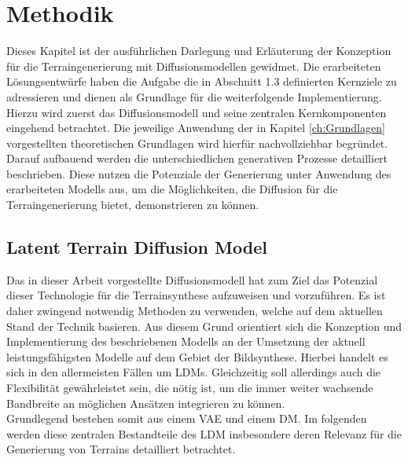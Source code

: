 \chapter{Methodik}
\label{ch:Methodik}

Dieses Kapitel ist der ausführlichen Darlegung und Erläuterung der Konzeption für die Terraingenerierung mit Diffusionsmodellen gewidmet. Die erarbeiteten Lösungsentwürfe haben die Aufgabe die in Abschnitt 1.3 definierten Kernziele zu adressieren und dienen als Grundlage für die weiterfolgende Implementierung. \\
Hierzu wird zuerst das Diffusionsmodell und seine zentralen Kernkomponenten eingehend betrachtet. Die jeweilige Anwendung der in Kapitel \ref{ch:Grundlagen} vorgestellten theoretischen Grundlagen wird hierfür nachvollziehbar begründet. \\
Darauf aufbauend werden die unterschiedlichen generativen Prozesse detailliert beschrieben. Diese nutzen die Potenziale der Generierung unter Anwendung des erarbeiteten Modells aus, um die Möglichkeiten, die Diffusion für die Terraingenerierung bietet, demonstrieren zu können.

\section {Latent Terrain Diffusion Model}
\label{sec:Planung_LDM}

Das in dieser Arbeit vorgestellte Diffusionsmodell hat zum Ziel das Potenzial dieser Technologie für die Terrainsynthese aufzuweisen und vorzuführen. Es ist daher zwingend notwendig Methoden zu verwenden, welche auf dem aktuellen Stand der Technik basieren. Aus diesem Grund orientiert sich die Konzeption und Implementierung des beschriebenen Modells an der Umsetzung der aktuell leistungsfähigsten Modelle auf dem Gebiet der Bildsynthese. Hierbei handelt es sich in den allermeisten Fällen um LDMs. Gleichzeitig soll allerdings auch die Flexibilität gewährleistet sein, die nötig ist, um die immer weiter wachsende Bandbreite an möglichen Ansätzen integrieren zu können.\\
Grundlegend bestehen somit aus einem \ac{VAE} und einem \ac{DM}. Im folgenden werden diese zentralen Bestandteile des LDM insbesondere deren Relevanz für die Generierung von Terrains detailliert betrachtet.

